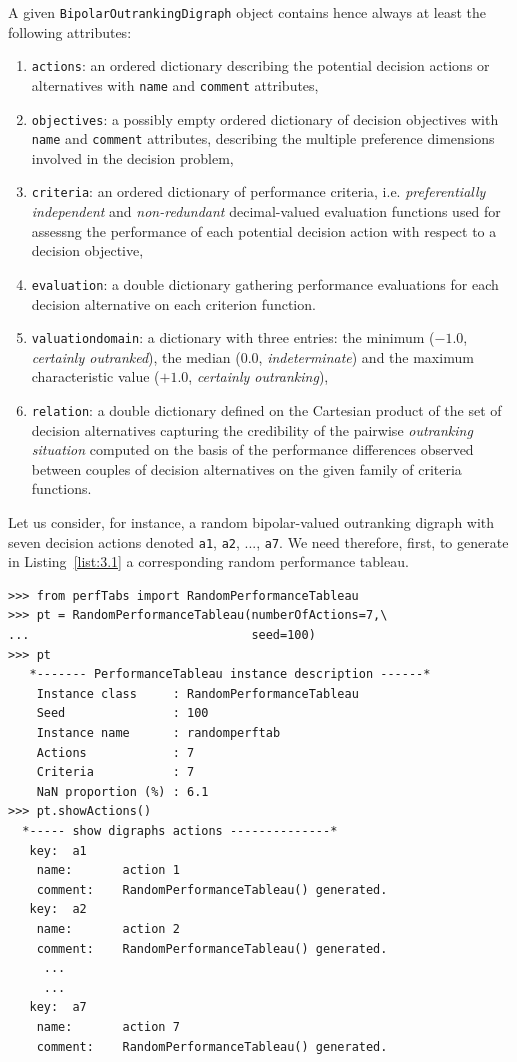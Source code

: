 A given \texttt{BipolarOutrankingDigraph} object contains hence always at least the following attributes:
\begin{enumerate}[topsep=3pt,partopsep=0pt]
\item \texttt{actions}: an ordered dictionary describing the potential decision actions or alternatives with \texttt{name} and \texttt{comment} attributes,
\item \texttt{objectives}: a possibly empty ordered dictionary of decision objectives with \texttt{name} and \texttt{comment} attributes, describing the multiple preference dimensions involved in the decision problem, 
\item \texttt{criteria}: an ordered dictionary of performance criteria, i.e. \emph{preferentially independent} and \emph{non-redundant} decimal-valued evaluation functions used for assessng the performance of each potential decision action with respect to a decision objective,
\item \texttt{evaluation}: a double dictionary gathering performance evaluations for each decision alternative on each criterion function. 
\item \texttt{valuationdomain}: a dictionary with three entries: the minimum ($-1.0$, \emph{certainly outranked}), the median ($0.0$, \emph{indeterminate}) and the maximum characteristic value ($+1.0$, \emph{certainly outranking}),
\item \texttt{relation}: a double dictionary defined on the Cartesian product of the set of decision alternatives capturing the credibility of the pairwise \emph{outranking situation} computed on the basis of the performance differences observed between couples of decision alternatives on the given family of criteria functions.   
\end{enumerate}

Let us consider, for instance, a random bipolar-valued outranking digraph with seven decision actions denoted \texttt{a1}, \texttt{a2}, ..., \texttt{a7}. We need therefore, first, to generate in Listing~\vref{list:3.1} a corresponding random performance tableau.
\begin{lstlisting}[caption={Generating a random performance tableau.},label=list:3.1]
>>> from perfTabs import RandomPerformanceTableau
>>> pt = RandomPerformanceTableau(numberOfActions=7,\
...                               seed=100)   
>>> pt
   *------- PerformanceTableau instance description ------*
    Instance class     : RandomPerformanceTableau
    Seed               : 100
    Instance name      : randomperftab
    Actions            : 7
    Criteria           : 7
    NaN proportion (%) : 6.1
>>> pt.showActions()
  *----- show digraphs actions --------------*
   key:  a1
    name:       action 1
    comment:    RandomPerformanceTableau() generated.
   key:  a2
    name:       action 2
    comment:    RandomPerformanceTableau() generated.
     ...
     ...
   key:  a7
    name:       action 7
    comment:    RandomPerformanceTableau() generated.
\end{lstlisting}

